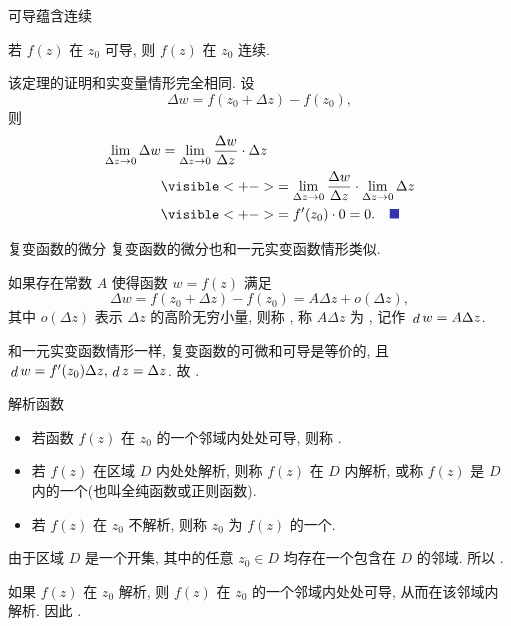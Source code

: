 \begin{frame}{可导蕴含连续}
\begin{theorem}
若 $f(z)$ 在 $z_0$ 可导, 则 $f(z)$ 在 $z_0$ 连续.
\end{theorem}
\begin{proofs}
该定理的证明和实变量情形完全相同.
\onslide<+->
设
\[\Delta w=f(z_0+\Delta z)-f(z_0),\]
\onslide<+->
则
\vspace{-\baselineskip}
\begin{align*}
\lim_{\Delta z\to 0}\Delta w
&=\lim_{\Delta z\to 0}\frac{\Delta w}{\Delta z}\cdot\Delta z\\
&\visible<+->{=\lim_{\Delta z\to 0}\frac{\Delta w}{\Delta z}\cdot\lim_{\Delta z\to 0}\Delta z}\\
&\visible<+->{=f'(z_0)\cdot 0=0.\mqed}
\end{align*}
\end{proofs}
\end{frame}


\begin{frame}{复变函数的微分}
\onslide<+->
复变函数的微分也和一元实变函数情形类似.
\begin{definition}
如果存在常数 $A$ 使得函数 $w=f(z)$ 满足
\[\Delta w=f(z_0+\Delta z)-f(z_0)=A\Delta z+o(\Delta z),\]
其中 $o(\Delta z)$ 表示 $\Delta z$ 的高阶无穷小量,
\onslide<+->
则称 ,
\onslide<+->
称 $A\Delta z$ 为 , 记作 $\,\mathop{d} w=A \Delta z$.
\end{definition}
\onslide<+->
和一元实变函数情形一样, 复变函数的可微和可导是等价的, 且 $\,\mathop{d} w=f'(z_0)\Delta z, \,\mathop{d} z=\Delta z$.
\onslide<+->
故 .
\end{frame}


\begin{frame}{解析函数}
\begin{definition}
\begin{itemize}
\item 若函数 $f(z)$ 在 $z_0$ 的一个邻域内处处可导, 则称 .
\item 若 $f(z)$ 在区域 $D$ 内处处解析, 则称 $f(z)$ 在 $D$ 内解析, 或称 $f(z)$ 是 $D$ 内的一个(也叫全纯函数或正则函数).
\item 若 $f(z)$ 在 $z_0$ 不解析, 则称 $z_0$ 为 $f(z)$ 的一个.
\end{itemize}
\end{definition}
\onslide<+->
由于区域 $D$ 是一个开集, 其中的任意 $z_0\in D$ 均存在一个包含在 $D$ 的邻域. 
\onslide<+->
所以 .

\onslide<+->
如果 $f(z)$ 在 $z_0$ 解析, 则 $f(z)$ 在 $z_0$ 的一个邻域内处处可导, 从而在该邻域内解析.
\onslide<+->
因此 .
\end{frame}


